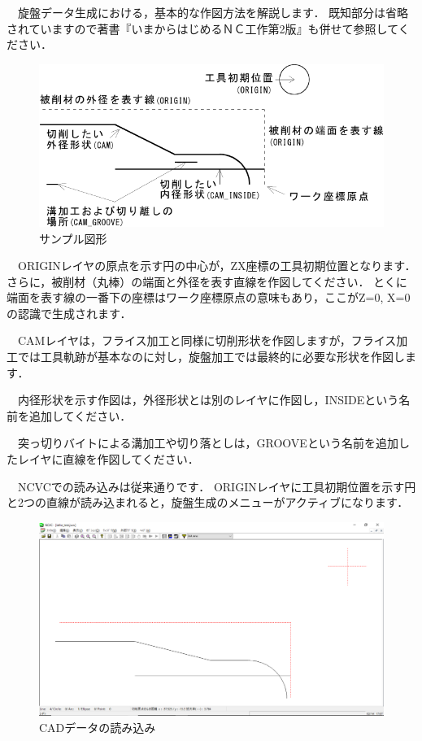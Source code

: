 

\vspace*{1zh}
　旋盤データ生成における，基本的な作図方法を解説します．
既知部分は省略されていますので著書『いまからはじめるＮＣ工作第2版』も併せて参照してください．

\begin{figure}[H]
\centering
\includegraphics{No1/fig/sample-crop.pdf}
\caption{サンプル図形}
\label{fig:sample.pdf}
\end{figure}

　ORIGINレイヤの原点を示す円の中心が，ZX座標の工具初期位置となります．
さらに，被削材（丸棒）の端面と外径を表す直線を作図してください．
とくに端面を表す線の一番下の座標はワーク座標原点の意味もあり，ここがZ=0, X=0の認識で生成されます．

　CAMレイヤは，フライス加工と同様に切削形状を作図しますが，フライス加工では工具軌跡が基本なのに対し，旋盤加工では最終的に必要な形状を作図します．

　内径形状を示す作図は，外径形状とは別のレイヤに作図し，INSIDEという名前を追加してください．

　突っ切りバイトによる溝加工や切り落としは，GROOVEという名前を追加したレイヤに直線を作図してください．

　NCVCでの読み込みは従来通りです．
ORIGINレイヤに工具初期位置を示す円と2つの直線が読み込まれると，旋盤生成のメニューがアクティブになります．

\begin{figure}[H]
\centering
\includegraphics[width=\textwidth]{No1/fig/read.png}
\caption{CADデータの読み込み}
\label{fig:read.png}
\end{figure}
